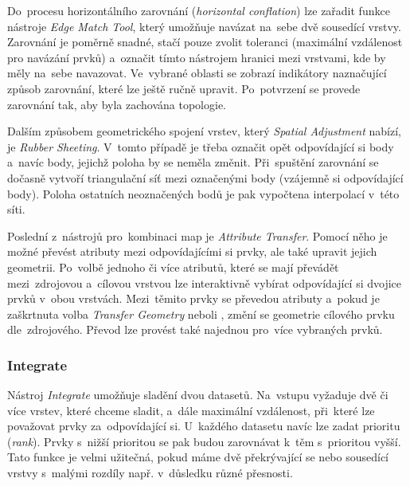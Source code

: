 Do~procesu horizontálního zarovnání (\textit{horizontal conflation}) lze 
zařadit funkce nástroje \textit{Edge Match Tool}, který umožňuje navázat 
na~sebe dvě sousedící vrstvy. Zarovnání je poměrně snadné, stačí pouze 
zvolit toleranci (maximální vzdálenost pro navázání prvků) a~označit tímto
nástrojem hranici mezi vrstvami, kde by měly na~sebe navazovat. Ve~vybrané
oblasti se zobrazí indikátory naznačující způsob zarovnání, které lze ještě
ručně upravit. Po~potvrzení se provede zarovnání tak, aby byla zachována
topologie.

Dalším způsobem geometrického spojení vrstev, který \textit{Spatial Adjustment}
nabízí, je \textit{Rubber Sheeting}. V~tomto případě je třeba označit opět 
odpovídající si body a~navíc body, jejichž poloha by se neměla změnit. 
Při~spuštění zarovnání se dočasně vytvoří triangulační síť mezi označenými body
(vzájemně si odpovídající body). Poloha ostatních neoznačených bodů je pak 
vypočtena interpolací v~této síti.

Poslední z~nástrojů pro~kombinaci map je \textit{Attribute Transfer}. Pomocí 
něho je možné převést atributy mezi odpovídajícími si prvky, ale také upravit
jejich geometrii. Po~volbě jednoho či více atributů, které se mají převádět 
mezi~zdrojovou a~cílovou vrstvou lze interaktivně vybírat odpovídající si 
dvojice prvků v~obou vrstvách. Mezi~těmito prvky se převedou atributy a~pokud
je zaškrtnuta volba \textit{Transfer Geometry} neboli ,
změní se geometrie cílového prvku dle~zdrojového. Převod lze provést také 
najednou pro~více vybraných prvků.



\subsubsection{Integrate}

Nástroj \textit{Integrate} umožňuje sladění dvou datasetů. Na~vstupu vyžaduje 
dvě či více vrstev, které chceme sladit, a~dále maximální vzdálenost, při~které
lze považovat prvky za~odpovídající si. U~každého datasetu navíc lze zadat 
prioritu (\textit{rank}). Prvky s~nižší prioritou se pak budou zarovnávat 
k~těm s~prioritou vyšší. Tato funkce je velmi užitečná, pokud máme dvě 
překrývající se nebo sousedící vrstvy s~malými rozdíly např. v~důsledku různé
přesnosti.

